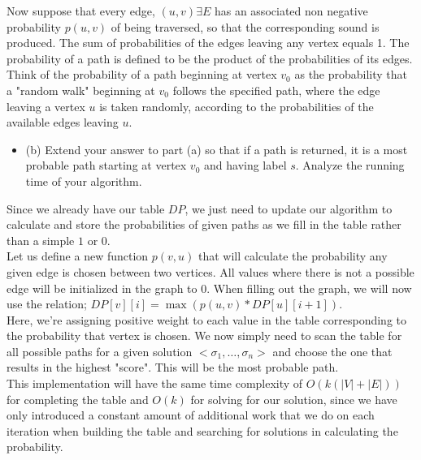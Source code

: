 \documentclass{article}
\begin{document}
\begin{enumerate}
\newpage
Now suppose that every edge, $(u,v) \exists E$ has an associated non negative probability $p(u,v)$ of being traversed, so that the corresponding sound is produced. The sum of probabilities of the edges leaving any vertex equals 1. The probability of a path is defined to be the product of the probabilities of its edges. Think of the probability of a path beginning at vertex $v_0$ as the probability that a "random walk" beginning at $v_0$ follows the specified path, where the edge leaving a vertex $u$ is taken randomly, according to the probabilities of the available edges leaving $u$.
\begin{itemize}
    \item (b) Extend your answer to part (a) so that if a path is returned, it is a most probable path starting at vertex $v_0$ and having label $s$. Analyze the running time of your algorithm.
\end{itemize}
Since we already have our table $DP$, we just need to update our algorithm to calculate and store the probabilities of given paths as we fill in the table rather than a simple $1$ or $0$. \\
\newline
Let us define a new function $p(v,u)$ that will calculate the probability any given edge is chosen between two vertices. All values where there is not a possible edge will be initialized in the graph to 0. When filling out the graph, we will now use the relation; $DP[v][i] = \max(p(u,v) * DP[u][i+1])$. \\
\newline
Here, we're assigning positive weight to each value in the table corresponding to the probability that vertex is chosen. We now simply need to scan the table for all possible paths for a given solution $<\sigma_1, \dots, \sigma_n>$ and choose the one that results in the highest "score". This will be the most probable path. \\
\newline
This implementation will have the same time complexity of $O(k(|V| + |E|))$ for completing the table and $O(k)$ for solving for our solution, since we have only introduced a constant amount of additional work that we do on each iteration when building the table and searching for solutions in calculating the probability.








\end{enumerate}
\end{document}
